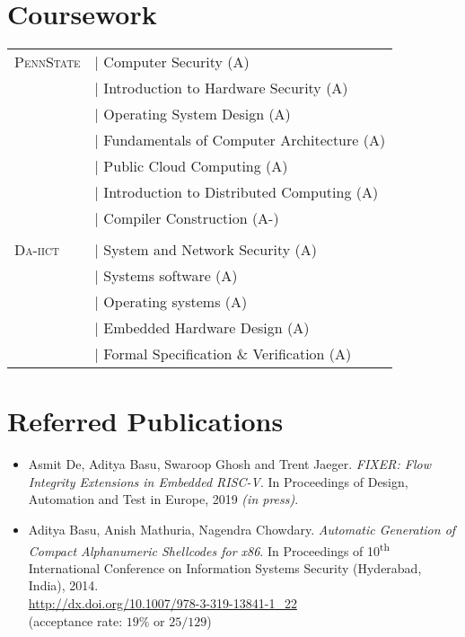 \documentclass[margin]{res}
\newcommand{\daiict}{\textsc{Da-iict}}
\newcommand{\psu}{\textsc{PennState}}
\begin{document}
\begin{resume}
\section{Coursework}
\begin{tabular}{l p{3in}}
\psu        & $\vert$ Computer Security (A)\\
            & $\vert$ Introduction to Hardware Security (A)\\
            & $\vert$ Operating System Design (A)\\
            & $\vert$ Fundamentals of Computer Architecture (A)\\
            & $\vert$ Public Cloud Computing (A)\\
            & $\vert$ Introduction to Distributed Computing (A)\\
            & $\vert$ Compiler Construction (A-)\\
\\
\daiict     & $\vert$ System and Network Security (A)\\
            & $\vert$ Systems software (A)\\
            & $\vert$ Operating systems (A)\\
            & $\vert$ Embedded Hardware Design (A)\\
            & $\vert$ Formal Specification \& Verification (A)
\end{tabular}

\section{Referred Publications}
\begin{itemize}
\item
    Asmit De, Aditya Basu, Swaroop Ghosh and Trent Jaeger.
    \emph{FIXER: Flow Integrity Extensions in Embedded RISC-V}.
    In Proceedings of Design, Automation and Test in Europe, 2019 \emph{(in press)}.

\item
    Aditya Basu, Anish Mathuria, Nagendra Chowdary.
    \emph{Automatic Generation of Compact Alphanumeric Shellcodes for x86}.
    In Proceedings of 10\textsuperscript{th} International Conference on Information Systems Security (Hyderabad, India), 2014.\\
    \url{http://dx.doi.org/10.1007/978-3-319-13841-1_22}\\
    (acceptance rate: $19\%$ or $25/129$)\\
\end{itemize}


\end{resume}
\end{document}
